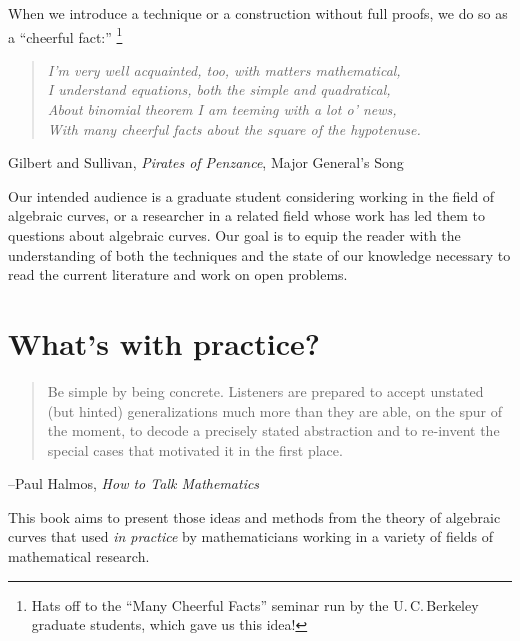 When we introduce a technique or a construction without full proofs,
we do so as a ``cheerful fact:''%
\footnote{Hats off to the ``Many Cheerful Facts'' seminar run
by the
U.\,C.\,Berkeley
graduate students, which gave us this idea!}

\begin{quote}\it{I'm very well acquainted, too, with matters mathematical,\\
I understand equations, both the simple and quadratical,\\
About binomial theorem I am teeming with a lot o' news,\\
With many cheerful facts about the square of the hypotenuse.}
%
%
\end{quote}
\emdash Gilbert and Sullivan, {\it Pirates of Penzance}, Major General's Song

Our intended audience is a graduate student considering working in the field of algebraic curves, or a researcher in a related field whose work has led them to questions about algebraic curves. Our goal is to equip the reader with the understanding of both the techniques and the state of our knowledge necessary to read the current literature and work on open problems.

\section*{What's with practice?}

\begin{quote}
Be simple by being concrete. Listeners are prepared to
accept unstated (but hinted) generalizations much more than they are able, on the spur of the moment, to
decode a precisely stated abstraction and to re-invent the special cases that motivated it in the first place. 
\end{quote}

--Paul Halmos, {\it How to Talk Mathematics}
%

This book aims to present those ideas and methods from the theory of  algebraic curves that  used \emph{in practice} by mathematicians working in a variety of fields of mathematical research.

